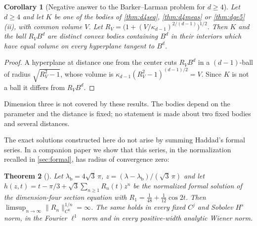 \documentclass[11pt]{amsart}
\numberwithin{equation}{section}
\newtheorem{theorem}{Theorem}[section]
\newtheorem{corollary}[theorem]{Corollary}
\theoremstyle{definition}
\theoremstyle{remark}
\newcommand{\norm}[1]{\lVert #1\rVert}
\newcommand{\lb}{\lambda_{\mathrm b}}
\begin{document}
\begin{corollary}[Negative answer to the Barker--Larman problem for $d\ge4$]\label{cor:BL}
Let $d\ge4$ and let $K$ be one of the bodies of \cref{thm:d4seq}, \cref{thm:d4meas} or \cref{thm:dge5}\textup{(ii)}, with common volume $V$. Let $R_V=\bigl(1+(V/\kappa_{d-1})^{2/(d-1)}\bigr)^{1/2}$. Then $K$ and the ball $R_VB^d$ are distinct convex bodies containing $B^d$ in their interiors which have equal volume on every hyperplane tangent to $B^d$.
\end{corollary}

\begin{proof}
A hyperplane at distance one from the center cuts $R_VB^d$ in a $(d-1)$-ball of radius $\sqrt{R_V^2-1}$, whose volume is $\kappa_{d-1}(R_V^2-1)^{(d-1)/2}=V$. Since $K$ is not a ball it differs from $R_VB^d$.
\end{proof}

Dimension three is not covered by these results. The bodies depend on the parameter and the distance is fixed; no statement is made about two fixed bodies and several distances.

The exact solutions constructed here do not arise by summing Haddad's formal series. In a companion paper \cite{KSdiv} we show that this series, in the normalization recalled in \cref{sec:formal}, has radius of convergence zero:

\begin{theorem}[{\cite{KSdiv}}]\label{thm:div}
Let $\lb=4\sqrt3\,\pi$, $z=(\lambda-\lb)/(\sqrt3\,\pi)$ and let $h(z,t)=t-\pi/3+\sqrt3\sum_{n\ge1}R_n(t)z^n$ be the normalized formal solution of the dimension-four section equation with $R_1=\tfrac1{48}+\tfrac1{12}\cos2t$. Then $\limsup_{n\to\infty}\norm{R_n}_{C^0}^{1/n}=\infty$. The same holds in every fixed $C^j$ and Sobolev $H^s$ norm, in the Fourier $\ell^1$ norm and in every positive-width analytic Wiener norm.
\end{theorem}
\end{document}
